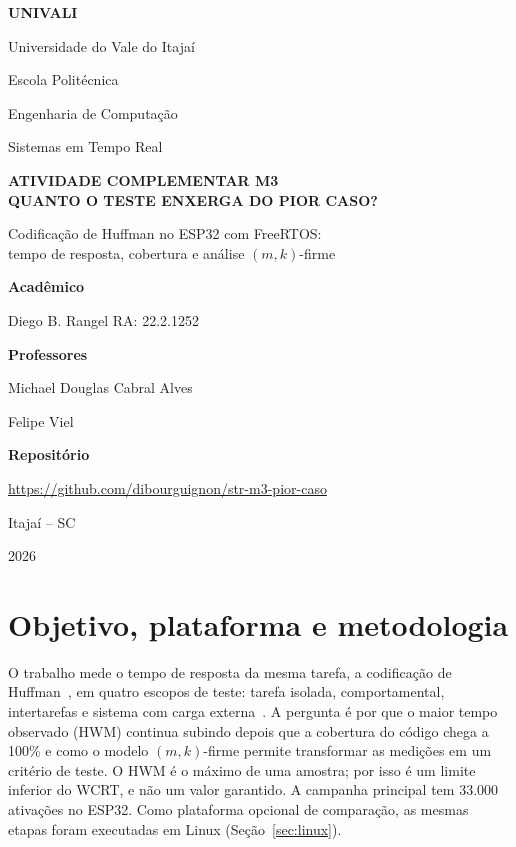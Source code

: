 \documentclass[11pt,a4paper]{article}
\newcommand{\repositorio}{\url{https://github.com/dibourguignon/str-m3-pior-caso}}
\begin{document}
\begin{titlepage}
  \centering
  {\Huge\bfseries\color{univali} UNIVALI\par}
  \vspace{0.5cm}
  {\large Universidade do Vale do Itajaí\par Escola Politécnica\par
   Engenharia de Computação\par Sistemas em Tempo Real\par}
  \vfill
  {\LARGE\bfseries ATIVIDADE COMPLEMENTAR M3\\[2pt]
   QUANTO O TESTE ENXERGA DO PIOR CASO?\par}
  \vspace{0.8cm}
  {\large Codificação de Huffman no ESP32 com FreeRTOS:\\
   tempo de resposta, cobertura e análise $(m,k)$-firme\par}
  \vfill
  {\large\bfseries Acadêmico\par}
  {\large Diego B. Rangel \quad RA: 22.2.1252\par}
  \vspace{0.8cm}
  {\large\bfseries Professores\par}
  {\large Michael Douglas Cabral Alves\par Felipe Viel\par}
  \vspace{0.8cm}
  {\large\bfseries Repositório\par}
  {\large \repositorio\par}
  \vfill
  {\large Itajaí -- SC\par 2026\par}
\end{titlepage}
\setcounter{page}{1}

\section{Objetivo, plataforma e metodologia}
O trabalho mede o tempo de resposta da mesma tarefa, a codificação de
Huffman~\cite{huffman}, em quatro escopos de teste: tarefa isolada,
comportamental, intertarefas e sistema com carga externa~\cite{enunciado}. A
pergunta é por que o maior tempo observado (HWM) continua subindo depois que a
cobertura do código chega a 100\% e como o modelo $(m,k)$-firme permite
transformar as medições em um critério de teste. O HWM é o máximo de uma
amostra; por isso é um limite inferior do WCRT, e não um valor garantido. A
campanha principal tem 33.000 ativações no ESP32. Como plataforma opcional de
comparação, as mesmas etapas foram executadas em Linux (Seção~\ref{sec:linux}).
\end{document}
